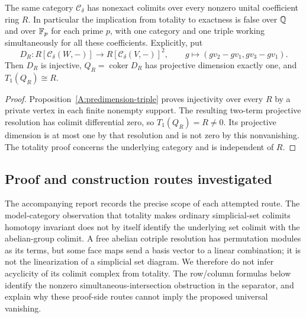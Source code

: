 \begin{corollary}\label{A:coefficients}
The same category $\mathcal C_\delta$ has nonexact colimits over
every nonzero unital coefficient ring $R$. In particular the
implication from totality to exactness is false over $\mathbb Q$ and over
$\mathbb F_p$ for each prime $p$, with one category and one triple
working simultaneously for all these coefficients. Explicitly, put
\[
 D_R:R[\mathcal C_\delta(W,-)]\longrightarrow
       R[\mathcal C_\delta(V,-)]^2,
 \qquad g\longmapsto(gv_2-gv_1,gv_3-gv_1).
\]
Then $D_R$ is injective, $Q_R=\operatorname{coker}D_R$ has
projective dimension exactly one, and $T_1(Q_R)\cong R$.
\end{corollary}
\begin{proof}
Proposition~\ref{A:predimension-triple} proves injectivity over
every $R$ by a private vertex in each finite nonempty support.
The resulting two-term projective resolution has colimit differential
zero, so $T_1(Q_R)=R\ne0$. Its projective dimension is at most
one by that resolution and is not zero by this nonvanishing.
The totality proof concerns the underlying category and is
independent of $R$.
\end{proof}

\subsection{Proof and construction routes investigated}
The accompanying report records the precise scope of each attempted
route. The model-category observation that totality makes ordinary
simplicial-set colimits homotopy invariant does not by itself identify
the underlying set colimit with the abelian-group colimit. A free
abelian cotriple resolution has permutation modules as its terms, but
some face maps send a basis vector to a linear combination; it is not
the linearization of a simplicial set diagram. We therefore do not infer
acyclicity of its colimit complex from totality. The row/column formulas
below identify the nonzero simultaneous-intersection obstruction in
the separator, and explain why these proof-side routes cannot imply
the proposed universal vanishing.
